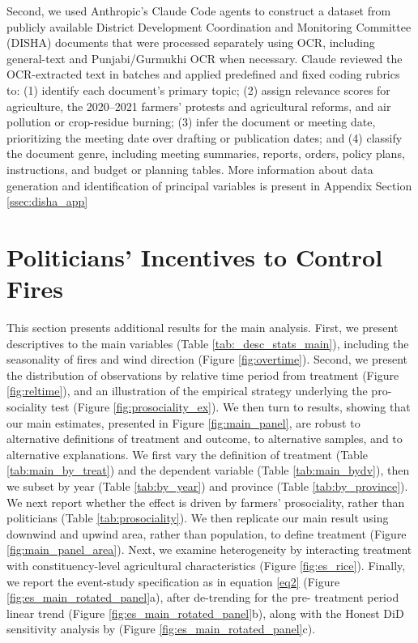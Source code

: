 \documentclass[12pt]{article}
\begin{document}
Second, we used Anthropic’s Claude Code agents to construct a dataset from publicly available District Development Coordination and Monitoring Committee (DISHA) documents that were processed separately using OCR, including general-text and Punjabi/Gurmukhi OCR when necessary. Claude reviewed the OCR-extracted text in batches and applied predefined and fixed coding rubrics to: (1) identify each document’s primary topic; (2) assign relevance scores for agriculture, the 2020--2021 farmers’ protests and agricultural reforms, and air pollution or crop-residue burning; (3) infer the document or meeting date, prioritizing the meeting date over drafting or publication dates; and (4) classify the document genre, including meeting summaries, reports, orders, policy plans, instructions, and budget or planning tables. More information about data generation and identification of principal variables is present in Appendix Section \ref{ssec:disha_app}



\FloatBarrier
\section{Politicians' Incentives to Control Fires}
This section presents additional results for the main analysis. First, we present descriptives to the main variables (Table \ref{tab:_desc_stats_main}), including the seasonality of fires and wind direction (Figure \ref{fig:overtime}). Second, we present the distribution of observations by relative time period from treatment (Figure \ref{fig:reltime}), and an illustration of the empirical strategy underlying the pro-sociality test (Figure \ref{fig:prosociality_ex}). We then turn to results, showing that our main estimates, presented in Figure \ref{fig:main_panel}, are robust to alternative definitions of treatment and outcome, to alternative samples, and to alternative explanations.
%
We first vary the definition of treatment (Table \ref{tab:main_by_treat}) and the dependent variable (Table  \ref{tab:main_bydv}), then we subset by year (Table \ref{tab:by_year}) and province (Table \ref{tab:by_province}). We next report whether the effect is driven by farmers' prosociality, rather than politicians (Table \ref{tab:prosociality}). We then replicate our main result using downwind and upwind area, rather than population, to define treatment (Figure \ref{fig:main_panel_area}). Next, we examine heterogeneity by interacting treatment with constituency-level agricultural characteristics (Figure \ref{fig:es_rice}). Finally, we report the event-study specification as in equation \ref{eq2} (Figure \ref{fig:es_main_rotated_panel}a), after de-trending for the pre-
treatment period linear trend (Figure \ref{fig:es_main_rotated_panel}b), along with the Honest DiD sensitivity analysis by \citet{rambachan2023more} (Figure \ref{fig:es_main_rotated_panel}c). 
\end{document}
